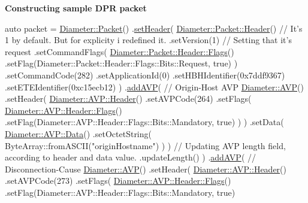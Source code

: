 {\bfseries Constructing sample D\+PR packet} 
\begin{DoxyCode}
\textcolor{keyword}{auto} packet = \hyperlink{classDiameter_1_1Packet}{Diameter::Packet}()
        .\hyperlink{classDiameter_1_1Packet_ac37c0f3736cc87e553ecb7b60e6962b2}{setHeader}(
            \hyperlink{classDiameter_1_1Packet_1_1Header}{Diameter::Packet::Header}()
                \textcolor{comment}{// It's 1 by default. But for explicity i redefined it. }
                .setVersion(1)
                \textcolor{comment}{// Setting that it's request }
                .setCommandFlags(
                    \hyperlink{classDiameter_1_1Packet_1_1Header_1_1Flags}{Diameter::Packet::Header::Flags}()
                        .setFlag(Diameter::Packet::Header::Flags::Bits::Request, \textcolor{keyword}{true})
                )
                .setCommandCode(282)
                .setApplicationId(0)
                .setHBHIdentifier(0x7ddf9367)
                .setETEIdentifier(0xc15ecb12)
        )
        .\hyperlink{classDiameter_1_1Packet_a36d19bb1e2ff1517dea5927bd77cc7b9}{addAVP}( \textcolor{comment}{// Origin-Host AVP}
            \hyperlink{classDiameter_1_1AVP}{Diameter::AVP}()
                .setHeader(
                    \hyperlink{classDiameter_1_1AVP_1_1Header}{Diameter::AVP::Header}()
                        .setAVPCode(264)
                        .setFlags(
                            \hyperlink{classDiameter_1_1AVP_1_1Header_1_1Flags}{Diameter::AVP::Header::Flags}()
                                .setFlag(Diameter::AVP::Header::Flags::Bits::Mandatory, \textcolor{keyword}{true})
                        )
                )
                .setData(
                    \hyperlink{classDiameter_1_1AVP_1_1Data}{Diameter::AVP::Data}()
                        .setOctetString(
                            ByteArray::fromASCII(\textcolor{stringliteral}{"originHostname"})
                        )
                )
                \textcolor{comment}{// Updating AVP length field, according to header and data value.}
                .updateLength()
        )
        .\hyperlink{classDiameter_1_1Packet_a36d19bb1e2ff1517dea5927bd77cc7b9}{addAVP}( \textcolor{comment}{// Disconnection-Cause}
            \hyperlink{classDiameter_1_1AVP}{Diameter::AVP}()
                .setHeader(
                    \hyperlink{classDiameter_1_1AVP_1_1Header}{Diameter::AVP::Header}()
                        .setAVPCode(273)
                        .setFlags(
                            \hyperlink{classDiameter_1_1AVP_1_1Header_1_1Flags}{Diameter::AVP::Header::Flags}()
                                .setFlag(Diameter::AVP::Header::Flags::Bits::Mandatory, \textcolor{keyword}{true})

\end{DoxyCode}
